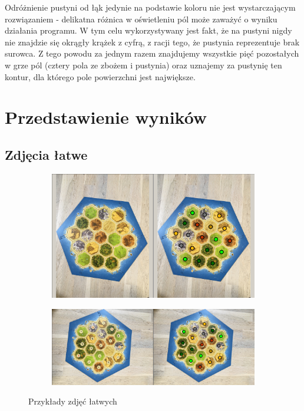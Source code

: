 \documentclass[a4paper]{article}
\begin{document}
Odróżnienie pustyni od łąk jedynie na podstawie koloru nie jest wystarczającym rozwiązaniem - delikatna różnica w oświetleniu pól może zaważyć o wyniku działania programu. W tym celu wykorzystywany jest fakt, że na pustyni nigdy nie znajdzie się okrągły krążek z cyfrą, z racji tego, że pustynia reprezentuje brak surowca. Z tego powodu za jednym razem znajdujemy wszystkie pięć pozostałych w grze pól (cztery pola ze zbożem i pustynia) oraz uznajemy za pustynię ten kontur, dla którego pole powierzchni jest największe.
      
\section{Przedstawienie wyników}
    \subsection{Zdjęcia łatwe}
     \begin{figure}[H]
        \begin{subfigure}[]{\linewidth}
            \includegraphics[width=\linewidth]{pictures/easy1.png}
        \end{subfigure}

        \begin{subfigure}[]{\linewidth}
            \includegraphics[width=\linewidth]{pictures/easy2.png}
        \end{subfigure}
        \caption{Przykłady zdjęć łatwych}
        \label{fig:easy}
    \end{figure}
\end{document}
